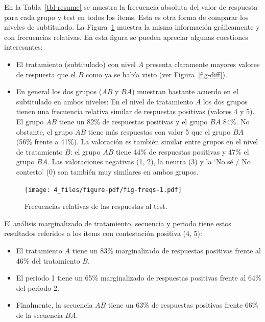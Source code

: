\documentclass[
  12pt,
  a4paper,
  extrafontsizes,
  onecolumn,
  openright,
  table]{memoir}
\begin{document}
En la Tabla~\ref{tbl-resume} se muestra la frecuencia absoluta del valor
de respuesta para cada grupo y test en todos los ítems. Esta es otra
forma de comparar los niveles de subtitulado. La Figura~\ref{fig-freqs}
muestra la misma información gráficamente y con frecuencias relativas.
En esta figura se pueden apreciar algunas cuestiones interesantes:

\begin{itemize}
\item
  El tratamiento (subtitulado) con nivel \(A\) presenta claramente
  mayores valores de respuesta que el \(B\) como ya se había visto (ver
  Figura~\ref{fig-diff}).
\item
  En general los dos grupos (\(AB\) y \(BA\)) muestran bastante acuerdo
  en el subtitulado en ambos niveles: En el nivel de tratamiento \(A\)
  los dos grupos tienen una frecuencia relativa similar de respuestas
  positivas (valores 4 y 5). El grupo \(AB\) tiene un 82\% de respuestas
  positivas y el grupo \(BA\) 84\%. No obstante, el grupo \(AB\) tiene
  más respuestas con valor 5 que el grupo \(BA\) (56\% frente a 41\%).
  La valoración es también similar entre grupos en el nivel de
  tratamiento \(B\): el grupo \(AB\) tiene 44\% de respuestas positivas
  y 47\% el grupo \(BA\). Las valoraciones negativas (1, 2), la neutra
  (3) y la \enquote*{No sé / No contesto} (0) son también muy similares
  en ambos grupos.
\end{itemize}

\begin{figure}[h]

{\centering \texttt{[image: 4\_files/figure-pdf/fig-freqs-1.pdf]}

}

\caption{\label{fig-freqs}Frecuencias relativas de las respuestas al
test.}

\end{figure}

El análisis marginalizado de tratamiento, secuencia y periodo tiene
estos resultados referidos a los ítems con contestación positiva (4, 5):

\begin{itemize}
\item
  El tratamiento \(A\) tiene un 83\% marginalizado de respuestas
  positivas frente al 46\% del tratamiento \(B\).
\item
  El periodo 1 tiene un 65\% marginalizado de respuestas positivas
  frente al 64\% del periodo 2.
\item
  Finalmente, la secuencia \(AB\) tiene un 63\% de respuestas positivas
  frente 66\% de la secuencia \(BA\).
\end{itemize}
\end{document}
